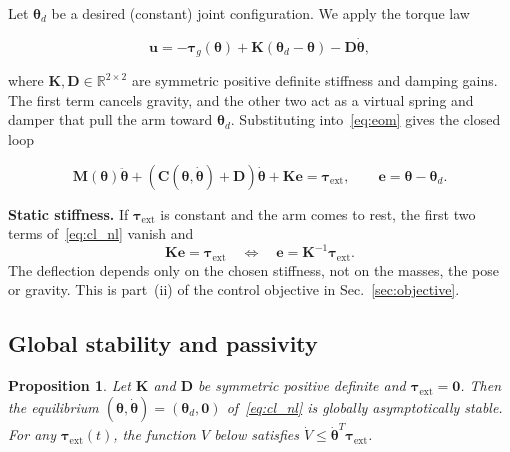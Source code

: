 \documentclass[letterpaper, 10pt, conference]{ieeeconf}
\newtheorem{proposition}{Proposition}
\begin{document}
Let $\boldsymbol{\theta}_d$ be a desired (constant) joint
configuration. We apply the torque law

\begin{equation}
\boxed{
\mathbf{u} = -\boldsymbol{\tau}_g(\boldsymbol{\theta})
+\mathbf{K}(\boldsymbol{\theta}_d-\boldsymbol{\theta})
-\mathbf{D}\dot{\boldsymbol{\theta}},
}
\label{eq:impedance}
\end{equation}

where $\mathbf{K},\mathbf{D}\in\mathbb{R}^{2\times2}$
are symmetric positive definite stiffness and damping
gains. The first term cancels gravity, and the other two
act as a virtual spring and damper that pull the arm toward
$\boldsymbol{\theta}_d$. Substituting into~\eqref{eq:eom} gives
the closed loop

\begin{equation}
\mathbf{M}(\boldsymbol{\theta})\ddot{\boldsymbol{\theta}}
+\left(\mathbf{C}(\boldsymbol{\theta},\dot{\boldsymbol{\theta}})
+\mathbf{D}\right)\dot{\boldsymbol{\theta}}
+\mathbf{K}\mathbf{e}
=\boldsymbol{\tau}_{\mathrm{ext}},
\qquad
\mathbf{e}=\boldsymbol{\theta}-\boldsymbol{\theta}_d .
\label{eq:cl_nl}
\end{equation}

\textbf{Static stiffness.} If $\boldsymbol{\tau}_{\mathrm{ext}}$
is constant and the arm comes to rest, the first two terms
of~\eqref{eq:cl_nl} vanish and
\begin{equation}
\mathbf{K}\mathbf{e}=\boldsymbol{\tau}_{\mathrm{ext}}
\quad\Longleftrightarrow\quad
\mathbf{e}=\mathbf{K}^{-1}\boldsymbol{\tau}_{\mathrm{ext}} .
\label{eq:static}
\end{equation}
The deflection depends only on the chosen stiffness, not on
the masses, the pose or gravity. This is part~(ii) of the
control objective in Sec.~\ref{sec:objective}.

\subsection{Global stability and passivity}

\begin{proposition}
\label{prop:gas}
Let $\mathbf{K}$ and $\mathbf{D}$ be symmetric positive definite
and $\boldsymbol{\tau}_{\mathrm{ext}}=\mathbf{0}$. Then the
equilibrium $(\boldsymbol{\theta},\dot{\boldsymbol{\theta}})=
(\boldsymbol{\theta}_d,\mathbf{0})$ of~\eqref{eq:cl_nl} is globally
asymptotically stable. For any
$\boldsymbol{\tau}_{\mathrm{ext}}(t)$, the function $V$ below
satisfies
$\dot V\le\dot{\boldsymbol{\theta}}^{T}\boldsymbol{\tau}_{\mathrm{ext}}$.
\end{proposition}
\end{document}
